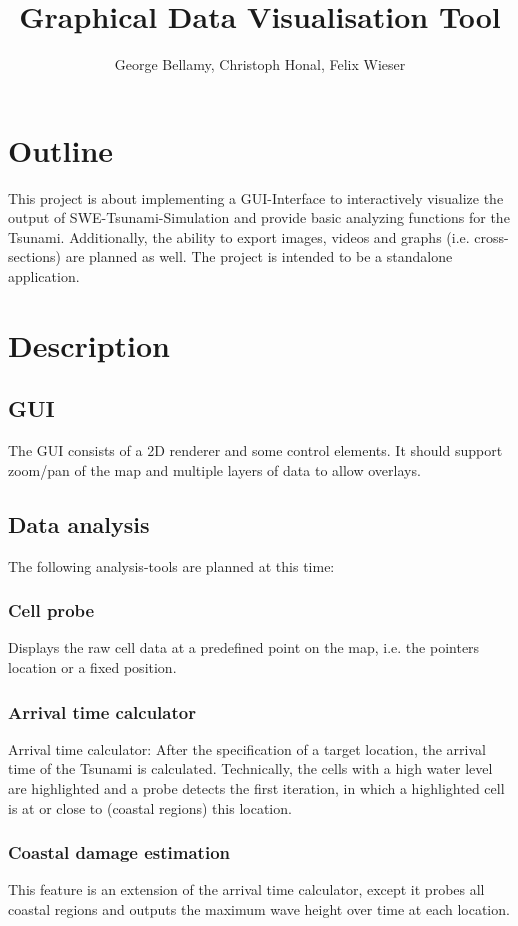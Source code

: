 \documentclass[paper=a4]{article}
\title{Graphical Data Visualisation Tool}
\author{George Bellamy, Christoph Honal, Felix Wieser}
\begin{document}
	\maketitle
	\section{Outline}
		This project is about implementing a GUI-Interface to interactively visualize the output of SWE-Tsunami-Simulation and provide basic analyzing functions for the Tsunami. Additionally, the ability to export images, videos and graphs (i.e. cross-sections) are planned as well. The project is intended to be a standalone application.
	\section{Description}
		\subsection{GUI}
			The GUI consists of a 2D renderer and some control elements. It should support zoom/pan of the map and multiple layers of data to allow overlays.
 		\subsection{Data analysis}
			The following analysis-tools are planned at this time:
			\subsubsection*{Cell probe}
				Displays the raw cell data at a predefined point on the map, i.e. the pointers location or a fixed position.
			\subsubsection*{Arrival time calculator}
				Arrival time calculator: After the specification of a target location, the arrival time of the Tsunami is calculated. Technically, the cells with a high water level are highlighted and a probe detects the first iteration, in which a highlighted cell is at or close to (coastal regions) this location.
			\subsubsection*{Coastal damage estimation}
				This feature is an extension of the arrival time calculator, except it probes all coastal regions and outputs the maximum wave height over time at each location.
\end{document}
